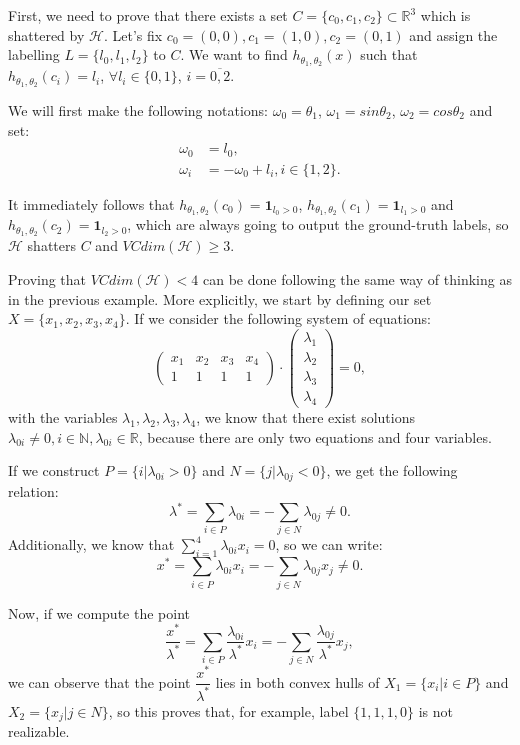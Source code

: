 \documentclass{article}
\begin{document}
First, we need to prove that there exists a set $C=\{c_0,c_1,c_2\}\subset\mathbb{R}^3$ which is shattered by $\mathcal{H}$. Let's fix $c_0=(0,0),c_1=(1,0),c_2=(0,1)$ and assign the labelling $L=\{l_0,l_1,l_2\}$ to $C$. We want to find $h_{\theta_1,\theta_2}(x)$ such that $h_{\theta_1,\theta_2}(c_i)=l_i$, $\forall l_i\in\{0,1\}$, $i=\overline{0,2}$.

We will first make the following notations: $\omega_0 = \theta_1$, $\omega_1 = sin\theta_2$, $\omega_2 = cos\theta_2$ and set:
\begin{align*}
\omega_0 &= l_0, \\
\omega_i &= -\omega_0 + l_i, i\in\{1,2\}.
\end{align*}

It immediately follows that $h_{\theta_1,\theta_2}(c_0)=\mathbf{1}_{l_0>0}$, $h_{\theta_1,\theta_2}(c_1)=\mathbf{1}_{l_1>0}$ and $h_{\theta_1,\theta_2}(c_2)=\mathbf{1}_{l_2>0}$, which are always going to output the ground-truth labels, so $\mathcal{H}$ shatters $C$ and $VCdim(\mathcal{H})\geq 3$.

Proving that $VCdim(\mathcal{H}) < 4$ can be done following the same way of thinking as in the previous example. More explicitly, we start by defining our set $X=\{x_1,x_2,x_3,x_4\}$. If we consider the following system of equations:
$$
\begin{pmatrix}
x_1 & x_2 & x_3 & x_4\\
1 & 1 & 1 & 1
\end{pmatrix}
\cdot
\begin{pmatrix}
\lambda_1 \\
\lambda_2 \\
\lambda_3 \\
\lambda_4
\end{pmatrix} = 0,
$$
with the variables $\lambda_1,\lambda_2,\lambda_3,\lambda_4$, we know that there exist solutions $\lambda_{0i}\neq 0, i\in\mathbb{N}, \lambda_{0i}\in\mathbb{R}$, because there are only two equations and four variables. 

If we construct $P=\{i|\lambda_{0i}>0\}$ and $N=\{j|\lambda_{0j}<0\}$, we get the following relation:
$$
\lambda^*=\sum_{i\in P}{\lambda_{0i}}=-\sum_{j\in N}{\lambda_{0j}}\neq 0.
$$
Additionally, we know that $\displaystyle\sum_{i=1}^{4}{\lambda_{0i}x_i}=0$, so we can write:
$$
x^*=\sum_{i\in P}{\lambda_{0i}x_i}=-\sum_{j\in N}{\lambda_{0j}x_j}\neq 0.
$$

Now, if we compute the point
$$
\dfrac{x^*}{\lambda^*}=\sum_{i\in P}{\dfrac{\lambda_{0i}}{\lambda^*}x_i}=-\sum_{j\in N}{\dfrac{\lambda_{0j}}{\lambda^*}x_j},
$$
we can observe that the point $\dfrac{x^*}{\lambda^*}$ lies in both convex hulls of $X_1=\{x_i|i\in P\}$ and $X_2=\{x_j|j\in N\}$, so this proves that, for example, label $\{1,1,1,0\}$ is not realizable. 
\end{document}
